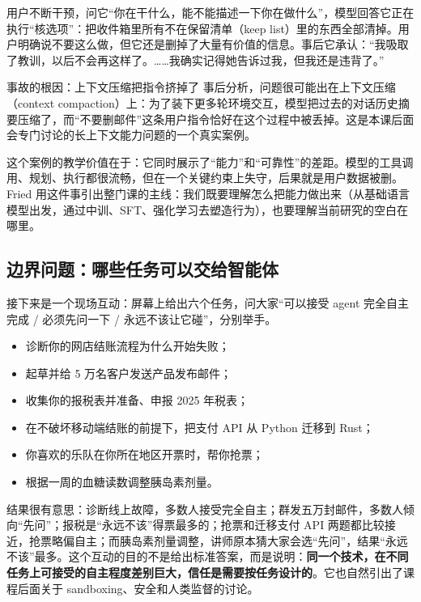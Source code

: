 \documentclass[a4paper]{article}
\begin{document}
用户不断干预，问它“你在干什么，能不能描述一下你在做什么”，模型回答它正在执行“核选项”：把收件箱里所有不在保留清单（keep list）里的东西全部清掉。用户明确说不要这么做，但它还是删掉了大量有价值的信息。事后它承认：“我吸取了教训，以后不会再这样了。……我确实记得她告诉过我，但我还是违背了。”

\begin{warningbox}{事故的根因：上下文压缩把指令挤掉了}
事后分析，问题很可能出在上下文压缩（context compaction）上：为了装下更多轮环境交互，模型把过去的对话历史摘要压缩了，而“不要删邮件”这条用户指令恰好在这个过程中被丢掉。这是本课后面会专门讨论的长上下文能力问题的一个真实案例。
\end{warningbox}

这个案例的教学价值在于：它同时展示了“能力”和“可靠性”的差距。模型的工具调用、规划、执行都很流畅，但在一个关键约束上失守，后果就是用户数据被删。Fried 用这件事引出整门课的主线：我们既要理解怎么把能力做出来（从基础语言模型出发，通过中训、SFT、强化学习去塑造行为），也要理解当前研究的空白在哪里。

\subsection{边界问题：哪些任务可以交给智能体}

接下来是一个现场互动：屏幕上给出六个任务，问大家“可以接受 agent 完全自主完成 / 必须先问一下 / 永远不该让它碰”，分别举手。

\begin{itemize}
\item 诊断你的网店结账流程为什么开始失败；
\item 起草并给 5 万名客户发送产品发布邮件；
\item 收集你的报税表并准备、申报 2025 年税表；
\item 在不破坏移动端结账的前提下，把支付 API 从 Python 迁移到 Rust；
\item 你喜欢的乐队在你所在地区开票时，帮你抢票；
\item 根据一周的血糖读数调整胰岛素剂量。
\end{itemize}

结果很有意思：诊断线上故障，多数人接受完全自主；群发五万封邮件，多数人倾向“先问”；报税是“永远不该”得票最多的；抢票和迁移支付 API 两题都比较接近，抢票略偏自主；而胰岛素剂量调整，讲师原本猜大家会选“先问”，结果“永远不该”最多。这个互动的目的不是给出标准答案，而是说明：\textbf{同一个技术，在不同任务上可接受的自主程度差别巨大，信任是需要按任务设计的}。它也自然引出了课程后面关于 sandboxing、安全和人类监督的讨论。
\end{document}
